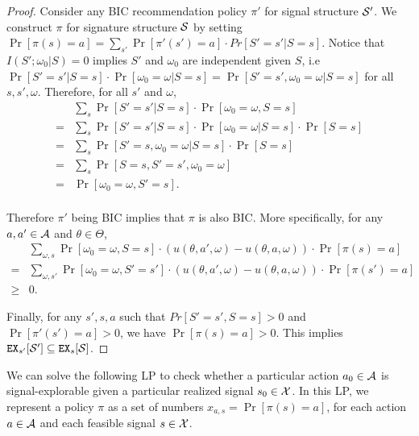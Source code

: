 \begin{proof}
Consider any BIC recommendation policy $\pi'$ for signal structure $\S'$. We construct $\pi$ for signature structure $\S$ by setting $\Pr[\pi(s) = a] = \sum_{s'} \Pr[\pi'(s') = a] \cdot Pr[S' = s'|S = s]$. Notice that $I(S' ; \omega_0|S) = 0$ implies $S'$ and $\omega_0$ are independent given $S$, i.e $\Pr[S' = s'|S=s] \cdot \Pr[\omega_0 = \omega|S=s] = \Pr[S'=s', \omega_0 = \omega|S=s]$ for all $s,s',\omega$. Therefore, for all $s'$ and $\omega$,
\begin{align*}
 &\sum_s \Pr[S' = s'|S = s] \cdot \Pr[\omega_0 = \omega, S= s] \\
=& \sum_s   \Pr[S' = s'|S=s] \cdot \Pr[\omega_0 = \omega|S=s] \cdot \Pr[S=s] \\
= &\sum_s \Pr[S'=s,\omega_0 =\omega|S=s] \cdot \Pr[S=s] \\
= &\sum_s \Pr[S=s,S'=s',\omega_0 =\omega] \\
= &\Pr[\omega_0 =\omega, S'=s].\\
\end{align*}

 Therefore $\pi'$ being BIC implies that $\pi$ is also BIC. More specifically, for any $a,a' \in \A$ and $\theta \in \varTheta$,
\begin{align*}
&\sum_{\omega,s} \Pr[\omega_0 = \omega, S = s] \cdot (u(\theta,a', \omega) - u(\theta,a,\omega)) \cdot \Pr[\pi(s) = a] \\
=&\sum_{\omega,s'}\Pr[\omega_0 = \omega, S' = s'] \cdot (u(\theta,a', \omega) - u(\theta,a,\omega)) \cdot \Pr[\pi(s') = a] \\
\geq & 0.
\end{align*}


Finally, for any $s', s ,a$ such that $Pr[S' = s',S = s] >0 $ and $\Pr[\pi'(s') = a] >0$, we have $\Pr[\pi(s) = a] > 0$. This implies $\EX_{s'}[\S'] \subseteq \EX_s[\S]$.
\end{proof}

We can solve the following LP to check whether a particular action $a_0 \in\A$ is signal-explorable given a particular realized signal $s_0\in\X$. In this LP, we represent a policy $\pi$ as a set of numbers
    $x_{a,s} = \Pr[\pi(s)=a]$,
for each action $a\in \A$ and each feasible signal $s\in \X$.


